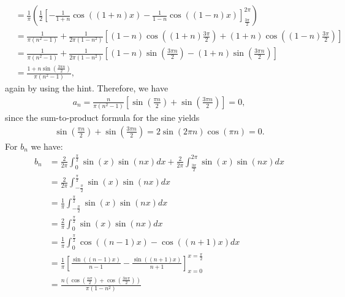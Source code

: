 \documentclass[11pt]{article}
\begin{document}
\begin{solution}
\begin{itemize}
\begin{align*}
        &= \frac 1 \pi \left( \frac 1 2 \left[ -\frac 1 {1 + n} \cos((1 + n)x) - \frac 1 {1 - n} \cos((1 - n)x) \right]_{\frac {3 \pi} 2}^{2 \pi} \right)\\
        &= \frac{1}{\pi(n^2 - 1)} + \frac{1}{2 \pi (1 - n^2)} \left[ (1 - n) \cos\left((1 + n)\frac{3 \pi}{2}\right) + (1 + n) \cos\left((1 - n) \frac{3 \pi}{2}\right)\right]\\
        &= \frac{1}{\pi(n^2 - 1)} + \frac{1}{2 \pi (1 - n^2)} \left[(1-n) \sin\left(\frac{3 \pi n}{2}\right) - (1 + n) \sin\left(\frac{3 \pi n}{2}\right)\right]\\
        &= \frac{1 + n \sin\left( \frac{3 \pi n}{2}\right)}{\pi(n^2 - 1)},
    \end{align*}
    again by using the hint. Therefore, we have
    \begin{align*}
        a_n = \frac{n}{\pi (n^2 - 1)} \left[ \sin\left( \frac{\pi n}{2}\right)  + \sin\left( \frac{3 \pi n}{2}\right)\right] = 0,
    \end{align*}
    since the sum-to-product formula for the sine yields
    \begin{align*}
        \sin\left( \frac{\pi n}{2}\right)  + \sin\left( \frac{3 \pi n}{2}\right) = 2 \sin\left(2 \pi n \right) \cos\left (\pi n \right) = 0.
    \end{align*}
    For $b_n$ we have:
    \begin{align*}
        b_n 
        &
        = 
        \frac{2}{2\pi}
        \int_{0}^{\frac{\pi}{2}} \sin(x) \sin(n x) dx
        +
        \frac{2}{2\pi}
        \int_{\frac{3\pi}{2}}^{2\pi} \sin(x) \sin(n x) dx
        \\&
        =
        \frac{2}{2\pi}
        \int_{-\frac{\pi}{2}}^{\frac{\pi}{2}} \sin(x) \sin(n x) dx
        \\&
        =
        \frac{1}{\pi}
        \int_{-\frac{\pi}{2}}^{\frac{\pi}{2}} \sin(x) \sin(n x) dx
        \\&
        =
        \frac{2}{\pi}
        \int_{0}^{\frac{\pi}{2}} \sin(x) \sin(n x) dx
        \\&
        =
        \frac{1}{\pi}
        \int_{0}^{\frac{\pi}{2}} \cos((n-1)x) - \cos((n+1)x) dx
        \\&
        =
        \frac{1}{\pi}
        \left[ \frac{\sin((n-1)x)}{n-1} - \frac{\sin((n+1)x)}{n+1}\right]_{x=0}^{x=\frac{\pi}{2}}
        \\&
        =
        \frac{n \left ( \cos(\frac{n \pi}{2}) + \cos(\frac{3 n \pi}{2})\right)}{\pi(1 - n^2)}
        \\&

\end{align*}
\end{itemize}
\end{solution}
\end{document}
